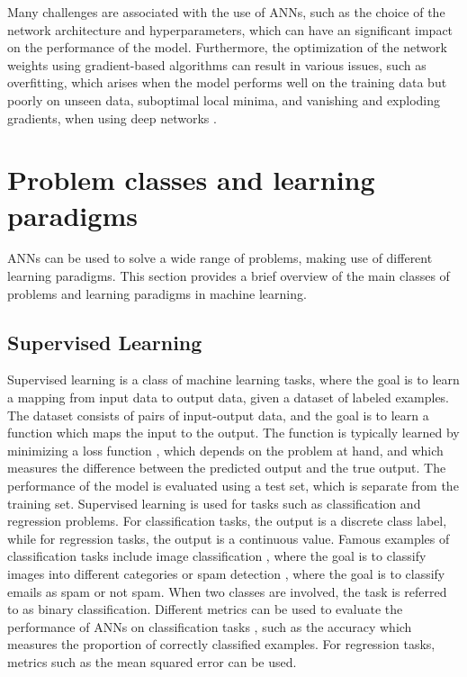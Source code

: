 Many challenges are associated with the use of ANNs, such as the choice of the network architecture and hyperparameters, which can have an significant
impact on the performance of the model. Furthermore, the optimization of the network weights using gradient-based algorithms can result in various issues, such
as overfitting, which arises when the model performs well on the training data but poorly on unseen data, suboptimal local minima, and vanishing and
exploding gradients, when using deep networks \cite{overfitting,vanishing_gradient}.

\section{Problem classes and learning paradigms}

ANNs can be used to solve a wide range of problems, making use of different learning paradigms. This section provides a brief overview of the main classes of
problems and learning paradigms in machine learning.

\subsection{Supervised Learning}

Supervised learning is a class of machine learning tasks, where the goal is to learn a mapping from input data to output data, given a dataset of labeled
examples. The dataset consists of pairs of input-output data, and the goal is to learn a function which maps the input to the output. The function is typically
learned by minimizing a loss function \cite{on_loss,loss_survey}, which depends on the problem at hand, and which measures the difference between the predicted output and
the true output. The performance of the model is evaluated using a test set, which is separate from the training set. Supervised learning is used for tasks such
as classification and regression problems. For classification tasks, the output is a discrete class label, while for regression tasks, the output is a continuous value.
Famous examples of classification tasks include image classification \cite{cnn,cnn_survey}, where the goal is to classify images into different categories or spam detection \cite{spam_survey},
where the goal is to classify emails as spam or not spam. When two classes are involved, the task is referred to as binary classification.
Different metrics can be used to evaluate the performance of ANNs on classification tasks \cite{classification_metrics}, such as the accuracy which measures the proportion of correctly
classified examples. For regression tasks, metrics such as the mean squared error \cite{mse} can be used.


